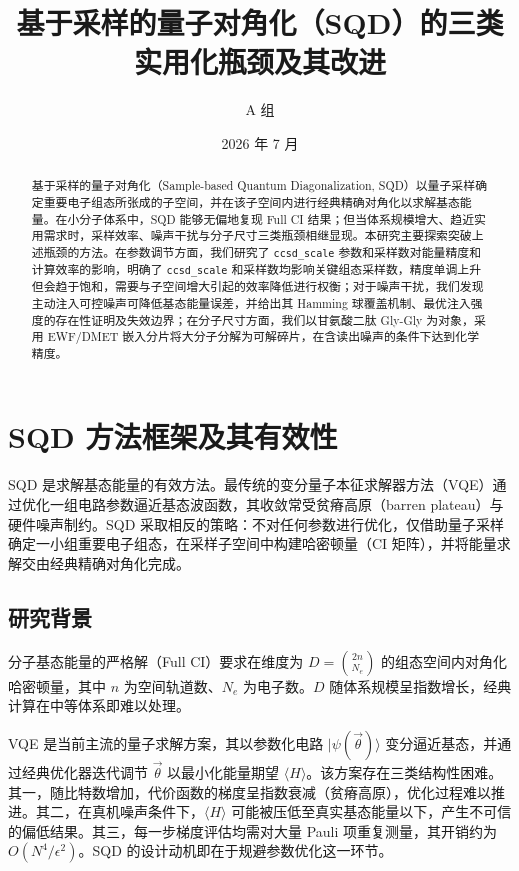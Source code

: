 \documentclass[UTF8,12pt,a4paper]{ctexart}
\title{基于采样的量子对角化（SQD）的三类实用化瓶颈及其改进}
\author{A 组}
\date{2026 年 7 月}
\begin{document}
\maketitle

\begin{abstract}
基于采样的量子对角化（Sample-based Quantum Diagonalization, SQD）以量子采样确定重要电子组态所张成的子空间，并在该子空间内进行经典精确对角化以求解基态能量。在小分子体系中，SQD 能够无偏地复现 Full CI 结果；但当体系规模增大、趋近实用需求时，采样效率、噪声干扰与分子尺寸三类瓶颈相继显现。本研究主要探索突破上述瓶颈的方法。在参数调节方面，我们研究了 \texttt{ccsd\_scale} 参数和采样数对能量精度和计算效率的影响，明确了 \texttt{ccsd\_scale} 和采样数均影响关键组态采样数，精度单调上升但会趋于饱和，需要与子空间增大引起的效率降低进行权衡；对于噪声干扰，我们发现主动注入可控噪声可降低基态能量误差，并给出其 Hamming 球覆盖机制、最优注入强度的存在性证明及失效边界；在分子尺寸方面，我们以甘氨酸二肽 Gly-Gly 为对象，采用 EWF/DMET 嵌入分片将大分子分解为可解碎片，在含读出噪声的条件下达到化学精度。
\end{abstract}

\tableofcontents
\newpage

\section{SQD 方法框架及其有效性}

SQD 是求解基态能量的有效方法。最传统的变分量子本征求解器方法（VQE）通过优化一组电路参数逼近基态波函数，其收敛常受贫瘠高原（barren plateau）与硬件噪声制约。SQD 采取相反的策略：不对任何参数进行优化，仅借助量子采样确定一小组重要电子组态，在采样子空间中构建哈密顿量（CI 矩阵），并将能量求解交由经典精确对角化完成。

\subsection{研究背景}

分子基态能量的严格解（Full CI）要求在维度为 $D=\binom{2n}{N_e}$ 的组态空间内对角化哈密顿量，其中 $n$ 为空间轨道数、$N_e$ 为电子数。$D$ 随体系规模呈指数增长，经典计算在中等体系即难以处理。

VQE 是当前主流的量子求解方案，其以参数化电路 $|\psi(\vec\theta)\rangle$ 变分逼近基态，并通过经典优化器迭代调节 $\vec\theta$ 以最小化能量期望 $\langle H\rangle$。该方案存在三类结构性困难。其一，随比特数增加，代价函数的梯度呈指数衰减（贫瘠高原），优化过程难以推进。其二，在真机噪声条件下，$\langle H\rangle$ 可能被压低至真实基态能量以下，产生不可信的偏低结果。其三，每一步梯度评估均需对大量 Pauli 项重复测量，其开销约为 $O(N^4/\epsilon^2)$。SQD 的设计动机即在于规避参数优化这一环节。
\end{document}
